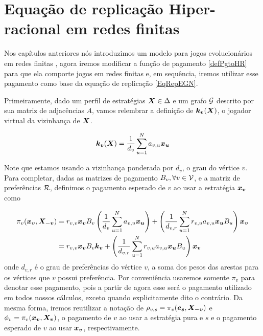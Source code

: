 \chapter{Equação de replicação Hiper-racional em redes finitas}

Nos capítulos anteriores nós introduzimos um modelo para jogos evolucionários em redes finitas \cite{madeo2015}, agora iremos modificar a função de pagamento \eqref{defPgtoHR} para que ela comporte jogos em redes finitas e, em sequência, iremos utilizar esse pagamento como base da equação de replicação \eqref{EqRepEGN}.

Primeiramente, dado um perfil de estratégias $\boldsymbol{X}\in\Delta$ e um grafo $\mathcal{G}$ descrito por sua matriz de adjacências $A$, vamos relembrar a definição de $\boldsymbol{k_v}(\boldsymbol{X})$, o jogador virtual da vizinhança de $\boldsymbol{X}$.

\begin{equation}
    \boldsymbol{k_v}(\boldsymbol{X})=\frac{1}{d_v}\sum^N_{u=1} a_{v,u} \boldsymbol{x_u}
\end{equation}

Note que estamos usando a vizinhança ponderada por $d_v$, o grau do vértice $v$. Para completar, dadas as matrizes de pagamento $B_v,\forall v\in\mathcal{V}$, e a matriz de preferências $\mathcal{R}$, definimos o pagamento esperado de $v$ ao usar a estratégia $\boldsymbol{x_v}$ como

\begin{equation}
\begin{split}
    \label{defPgtoEGNHR}
    \pi_v(\boldsymbol{x_v},\boldsymbol{X_{-v}}) &= r_{v,v}\boldsymbol{x_v} B_v \left(\frac{1}{d_v}\sum_{u=1}^N a_{v,u}\boldsymbol{x_u}\right)+ \left(\frac{1}{d_{v,r}}\sum_{u=1}^N r_{v,u} a_{v,u} \boldsymbol{x_u}B_u\right) \boldsymbol{x_v} \\
    &= r_{v,v}\boldsymbol{x_v} B_v \boldsymbol{k_v}+ \left(\frac{1}{d_{v,r}}\sum_{u=1}^N r_{v,u}a_{v,u}\boldsymbol{x_u}B_u\right) \boldsymbol{x_v}
\end{split}
\end{equation}
onde $d_{v,r}$ é o grau de preferências do vértice $v$, a soma dos pesos das arestas para os vértices que $v$ possui preferência. Por conveniência usaremos somente $\pi_v$ para denotar esse pagamento, pois a partir de agora esse será o pagamento utilizado em todos nossos cálculos, exceto quando explicitamente dito o contrário. Da mesma forma, iremos reutilizar a notação de $\rho_{v,s}=\pi_v(\boldsymbol{e_s},\boldsymbol{X_{-v}})$ e $\phi_v=\pi_v(\boldsymbol{x_v},\boldsymbol{X_v})$, o pagamento de $v$ ao usar a estratégia pura e $s$ e o pagamento esperado de $v$ ao usar $\boldsymbol{x_v}$, respectivamente.

